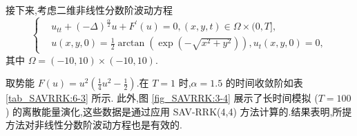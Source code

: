 	\begin{example}\label{exp_SAVRRK:3}
		\cite{wangUnconditionalEnergyDissipation2021} 
		接下来,考虑二维非线性分数阶波动方程
		\begin{equation}
		\begin{cases}
		& u_{t t}+(-\Delta)^{\frac{\alpha}{2}} u+F^{\prime}(u)=0,(x, y, t) \in \Omega \times(0, T],\\
		& u(x, y, 0)=\frac{1}{2} \arctan \left(\exp \left(-\sqrt{x^2+y^2}\right)\right), u_t(x, y, 0)=0,
		\end{cases}
		\end{equation}
		其中 $\Omega=(-10,10) \times(-10,10)$.
		\end{example}
		
		取势能 $F(u)=u^2\left(\frac{1}{4} u^2-\frac{1}{2}\right)$.在 $T=1$ 时,$\alpha=1.5$ 的时间收敛阶如表 \ref{tab_SAVRRK:6-3} 所示.
		此外,图 \ref{fig_SAVRRK:3-4} 展示了长时间模拟 ($T=100$) 的离散能量演化,这些数据是通过应用 SAV-RRK(4,4) 方法计算的.结果表明,所提方法对非线性分数阶波动方程也是有效的.
		
